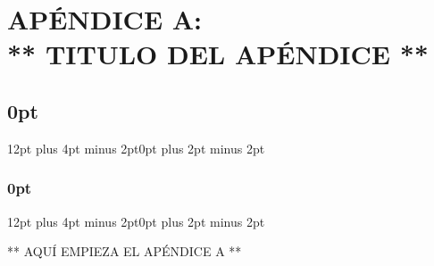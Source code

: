 \chapter*{APÉNDICE A:\\ ** TITULO DEL APÉNDICE **}
\thispagestyle{empty}

\renewcommand{\thefigure}{A.\arabic{figure}}
\setcounter{figure}{0}

\titlespacing\section{0pt}{12pt plus 4pt minus 2pt}{0pt plus 2pt minus 2pt}
\titlespacing\subsection{0pt}{12pt plus 4pt minus 2pt}{0pt plus 2pt minus 2pt}

** AQUÍ EMPIEZA EL APÉNDICE A **